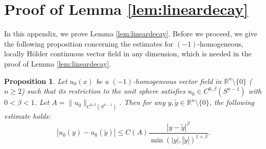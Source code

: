 \documentclass[12pt]{amsart}
\numberwithin{equation}{section}              %
\newtheorem{proposition}{Proposition}[section]
\theoremstyle{remark}
\begin{document}
		
	\appendix
    \section{Proof of Lemma \ref{lem:lineardecay}}\label{app:lineardecay}
In this appendix, we prove Lemma \ref{lem:lineardecay}. Before we proceed, we give the following proposition concerning the
  estimates for $(-1)$-homogeneous, locally H\"older continuous vector field in any dimension, which is needed in the proof of Lemma \ref{lem:lineardecay}.
\begin{proposition}\label{prop:Holderdecay}
Let $u_0(x)$ be a $(-1)$-homogeneous vector field in $\mathbb{R}^n \setminus \{0\}$ ($n\geq 2$) such that its restriction to the unit sphere satisfies $u_0 \in C^{0,\beta}(S^{n-1})$ with $0 < \beta < 1$. Let $A = \|u_0\|_{C^{0,\beta}(S^{n-1})}$. Then for any $y, \tilde{y} \in \mathbb{R}^n \setminus \{0\}$, the following estimate holds:
\begin{equation} \label{eq:u0_holder_global}
    |u_0(y) - u_0(\tilde{y})| \leq C(A) \frac{|y-\tilde{y}|^\beta}{\min( |y|,|\tilde{y}|)^{1+\beta}}.
\end{equation}
\end{proposition}
\end{document}
